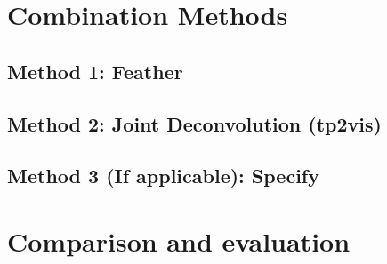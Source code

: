 \documentclass[12pt,a4paper]{article}
\begin{document}
\begin{figure}[!htb]
\centering
{}
\hfill
{}%
\hfill
\vspace{20pt}
\caption{\label{fig:example}}
\end{figure}

\section{Combination Methods}

\subsection{Method 1: Feather}

\subsection{Method 2: Joint Deconvolution (tp2vis)}

\subsection{Method 3 (If applicable): Specify}

\section{Comparison and evaluation}
\end{document}
